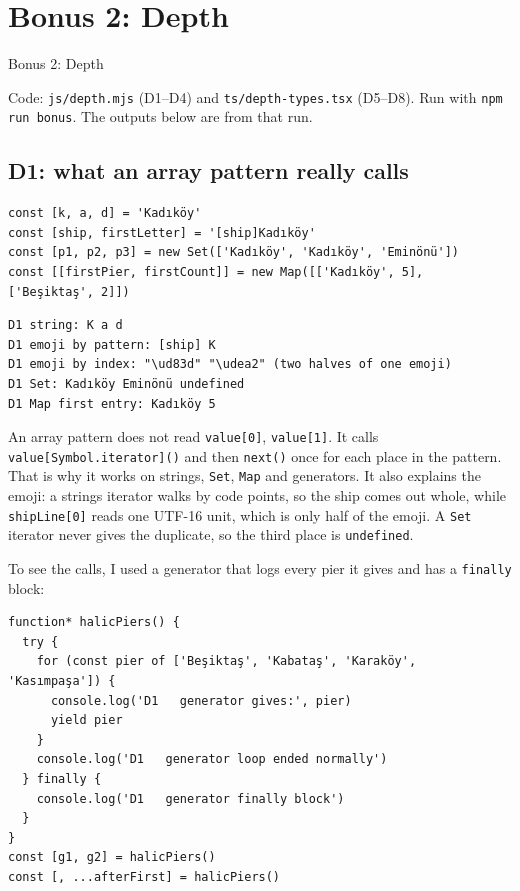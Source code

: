 \documentclass[
  10pt,
]{article}
\begin{document}
\hypertarget{bonus-2-depth}{%
\section{Bonus 2: Depth}\label{bonus-2-depth}}

Bonus 2: Depth

Code: \texttt{js/\allowbreak{}depth.\allowbreak{}mjs} (D1--D4) and
\texttt{ts/\allowbreak{}depth-types.\allowbreak{}tsx} (D5--D8). Run with
\texttt{npm run bonus}. The outputs below are from that run.

\hypertarget{d1-what-an-array-pattern-really-calls}{%
\subsection{D1: what an array pattern really
calls}\label{d1-what-an-array-pattern-really-calls}}

\begin{verbatim}
const [k, a, d] = 'Kadıköy'
const [ship, firstLetter] = '[ship]Kadıköy'
const [p1, p2, p3] = new Set(['Kadıköy', 'Kadıköy', 'Eminönü'])
const [[firstPier, firstCount]] = new Map([['Kadıköy', 5], ['Beşiktaş', 2]])
\end{verbatim}

\begin{verbatim}
D1 string: K a d
D1 emoji by pattern: [ship] K
D1 emoji by index: "\ud83d" "\udea2" (two halves of one emoji)
D1 Set: Kadıköy Eminönü undefined
D1 Map first entry: Kadıköy 5
\end{verbatim}

An array pattern does not read \texttt{value[\allowbreak{}0]},
\texttt{value[\allowbreak{}1]}. It calls
\texttt{value[\allowbreak{}Symbol.\allowbreak{}iterator](\allowbreak{})}
and then \texttt{next(\allowbreak{})} once for each place in the
pattern. That is why it works on strings, \texttt{Set}, \texttt{Map} and
generators. It also explains the emoji: a string\textquotesingle s
iterator walks by code points, so the ship comes out whole, while
\texttt{shipLine[\allowbreak{}0]} reads one UTF-16 unit, which is only
half of the emoji. A \texttt{Set} iterator never gives the duplicate, so
the third place is \texttt{undefined}.

To see the calls, I used a generator that logs every pier it gives and
has a \texttt{finally} block:

\begin{verbatim}
function* halicPiers() {
  try {
    for (const pier of ['Beşiktaş', 'Kabataş', 'Karaköy', 'Kasımpaşa']) {
      console.log('D1   generator gives:', pier)
      yield pier
    }
    console.log('D1   generator loop ended normally')
  } finally {
    console.log('D1   generator finally block')
  }
}
const [g1, g2] = halicPiers()
const [, ...afterFirst] = halicPiers()
\end{verbatim}
\end{document}
